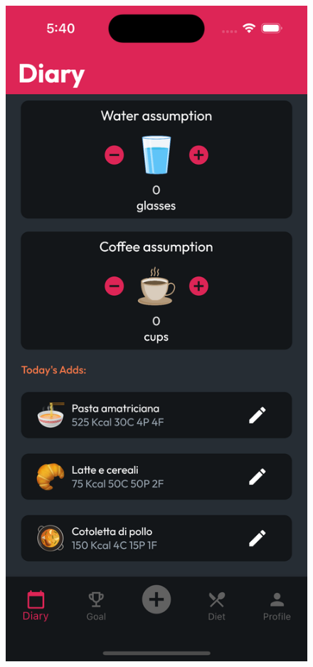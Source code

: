 \documentclass{Configuration_Files/PoliMi3i_thesis}
\begin{document}
\begin{figure}[!h]
    \centering
    \includegraphics[scale=0.1]{Images/Screenshots/Mobile/Diary2.png}

\end{figure}
\end{document}
